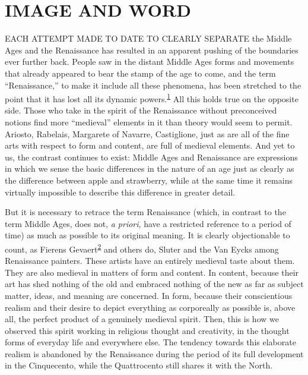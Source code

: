 \chapter{IMAGE AND WORD}

EACH ATTEMPT MADE TO DATE TO CLEARLY SEPARATE the Middle Ages and the
Renaissance has resulted in an apparent pushing of the boundaries ever
further back. People saw in the distant Middle Ages forms and movements
that already appeared to bear the stamp of the age to come, and the term
``Renaissance,'' to make it include all these phenomena, has been
stretched to the point that it has lost all its dynamic
powers.\textsuperscript{\protect\hypertarget{21_Chapter_Thirteen__IMAGE_AND_WORD.xhtmlux5cux23id_306}{\protect\hyperlink{23_NOTES.xhtmlux5cux23id_307}{1}}}
All this holds true on the opposite side. Those who take in the spirit
of the Renaissance without preconceived notions find more ``medieval''
elements in it than theory would seem to permit. Ariosto, Rabelais,
Margarete of Navarre, Castiglione, just as are all of the fine arts with
respect to form and content, are full of medieval elements. And yet to
us, the contrast continues to exist: Middle Ages and Renaissance are
expressions in which we sense the basic differences in the nature of an
age just as clearly as the difference between apple and strawberry,
while at the same time it remains virtually impossible to describe this
difference in greater detail.

But it is necessary to retrace the term Renaissance (which, in contrast
to the term Middle Ages, does not, \emph{a priori}, have a restricted
reference to a period of time) as much as possible to its original
meaning. It is clearly objectionable to count, as Fierens
Gevaert\textsuperscript{\protect\hypertarget{21_Chapter_Thirteen__IMAGE_AND_WORD.xhtmlux5cux23id_304}{\protect\hyperlink{23_NOTES.xhtmlux5cux23id_305}{2}}}
and others do, Sluter and the Van Eycks among Renaissance painters.
These artists have an entirely medieval taste about them. They are also
medieval in matters of form and content. In content, because their art
has shed nothing of the old and embraced nothing of the new as far as
subject matter, ideas, and meaning are concerned. In form, because their
conscientious realism and their desire to depict everything as
corporeally as possible is, above all, the perfect product of a
genuinely medieval spirit. Then, this is how we observed this spirit
working in religious thought and creativity, in the thought forms of
everyday life and everywhere else.
\protect\hypertarget{21_Chapter_Thirteen__IMAGE_AND_WORD.xhtmlux5cux23page_330}{}{}The
tendency towards this elaborate realism is abandoned by the Renaissance
during the period of its full development in the Cinquecento, while the
Quattrocento still shares it with the North.


